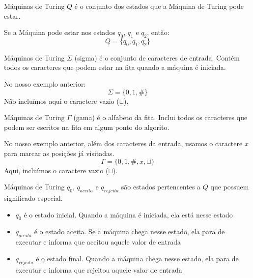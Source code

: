 \documentclass{beamer}
\begin{document}
\begin{frame}{Máquinas de Turing}
	$Q$ é o conjunto dos estados que a Máquina de Turing pode estar.
	\begin{center}
		\renewcommand{\TuringInput} {0,1,0,\#,0,1,0,$\sqcup$}
		\renewcommand{\TuringHead} 1
		\renewcommand{\TuringState} {$q_{0}$}
		\renewcommand{\TuringRightEnd} {$\ldots$}
		\renewcommand{\TuringLeftEnd} {}
		\TuringMachine
	\end{center}
	Se a Máquina pode estar nos estados $q_{0}$, $q_{1}$ e $q_{2}$, então:
	\begin{equation*}
		Q = \{q_{0}, q_{1}, q_{2}\}
	\end{equation*}
\end{frame}
\begin{frame}{Máquinas de Turing}
	$\Sigma$ (sigma) é o conjunto de caracteres de entrada. Contém todos os caracteres que podem estar na fita quando a máquina é iniciada.
	\begin{center}
		\renewcommand{\TuringInput} {0,1,0,\#,0,1,0,$\sqcup$}
		\renewcommand{\TuringHead} 1
		\renewcommand{\TuringState} {$q_{0}$}
		\renewcommand{\TuringRightEnd} {$\ldots$}
		\renewcommand{\TuringLeftEnd} {}
		\TuringMachine
	\end{center}
	No nosso exemplo anterior:
	\begin{equation*}
	\Sigma = \{0, 1, \#\}
	\end{equation*}
	Não incluímos aqui o caractere vazio ($\sqcup$).
\end{frame}
\begin{frame}{Máquinas de Turing}
	$\Gamma$ (gama) é o alfabeto da fita. Inclui todos os caracteres que podem ser escritos na fita em algum ponto do algorito.
	\begin{center}
		\renewcommand{\TuringInput} {x,x,0,\#,x,x,0,$\sqcup$}
		\renewcommand{\TuringHead} 4
		\renewcommand{\TuringState} {$q_{0}$}
		\renewcommand{\TuringRightEnd} {$\ldots$}
		\renewcommand{\TuringLeftEnd} {}
		\TuringMachine
	\end{center}
	No nosso exemplo anterior, além dos caracteres da entrada, usamos o caractere $x$ para marcar as posições já visitadas.
	\begin{equation*}
	\Gamma = \{0, 1, \#, x, \sqcup\}
	\end{equation*}
	Aqui, incluímos o caractere vazio ($\sqcup$).
\end{frame}
\begin{frame}{Máquinas de Turing}
	$q_{0}$, $q_{aceita}$ e $q_{rejeita}$ são estados pertencentes a $Q$ que possuem significado especial.
	\begin{itemize}
		\item \textbf{$q_{0}$} é o estado inicial. Quando a máquina é iniciada, ela está nesse estado
		\item \textbf{$q_{aceita}$} é o estado aceita. Se a máquina chega nesse estado, ela para de executar e informa que \alert{aceitou} aquele valor de entrada
		\item \textbf{$q_{rejeita}$} é o estado final. Quando a máquina chega nesse estado, ela para de executar e informa que \alert{rejeitou} aquele valor de entrada
	\end{itemize}
\end{frame}
\end{document}
